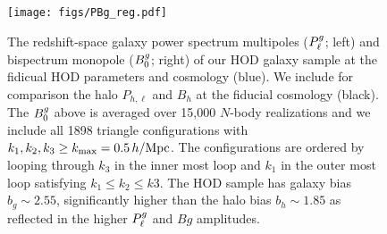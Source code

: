 \begin{figure}
\begin{center}
    \texttt{[image: figs/PBg\_reg.pdf]} 
    \caption{The redshift-space galaxy power spectrum multipoles ($P^g_{\ell}$; left)
    and bispectrum monopole ($B^g_0$; right) of our HOD galaxy sample at the
    fidicual HOD parameters and cosmology (blue). We include for comparison the
    halo $P_{h,\ell}$ and $B_{h}$ at the fiducial cosmology (black). The $B^g_0$
    above is averaged over 15,000 $N$-body realizations and we include all 1898
    triangle configurations with $k_1, k_2, k_3 \ge k_{\rm max} = 0.5\,h/\mathrm{Mpc}$.
    The configurations are ordered by looping through $k_3$ in the inner
    most loop and $k_1$ in the outer most loop satisfying $k_1 \le k_2 \le k3$.
    The HOD sample has galaxy bias $b_g\sim2.55$, significantly higher than the
    halo bias $b_h\sim1.85$ as reflected in the higher $P^g_{\ell}$ and $Bg$
    amplitudes.
    }
\label{fig:bgh}
\end{center}
\end{figure}
